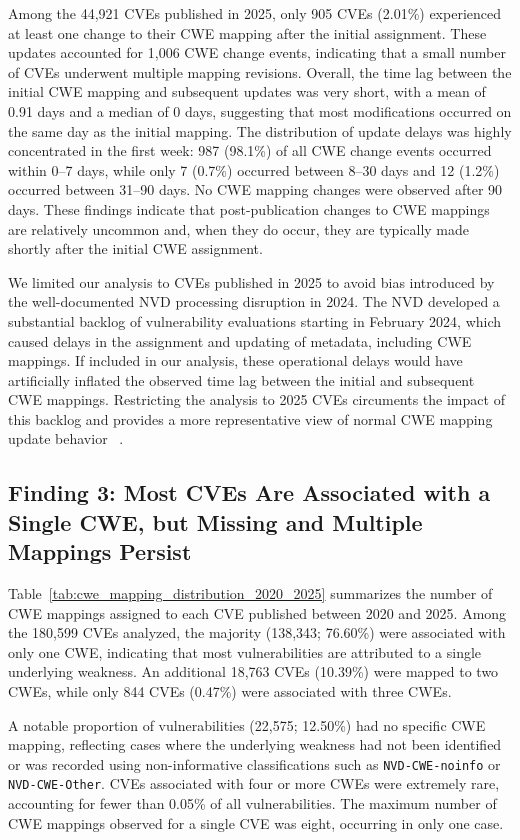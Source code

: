 \documentclass[conference,compsoc]{IEEEtran}
\begin{document}
Among the 44,921 CVEs published in 2025, only 905 CVEs (2.01\%) experienced at least one change to their CWE mapping after the initial assignment. These updates accounted for 1,006 CWE change events, indicating that a small number of CVEs underwent multiple mapping revisions. Overall, the time lag between the initial CWE mapping and subsequent updates was very short, with a mean of 0.91 days and a median of 0 days, suggesting that most modifications occurred on the same day as the initial mapping. The distribution of update delays was highly concentrated in the first week: 987 (98.1\%) of all CWE change events occurred within 0–7 days, while only 7 (0.7\%) occurred between 8–30 days and 12 (1.2\%) occurred between 31–90 days. No CWE mapping changes were observed after 90 days. These findings indicate that post-publication changes to CWE mappings are relatively uncommon and, when they do occur, they are typically made shortly after the initial CWE assignment.

We limited our analysis to CVEs published in 2025 to avoid bias introduced by the well-documented NVD processing disruption in 2024. The NVD developed a substantial backlog of vulnerability evaluations starting in February 2024, which caused delays in the assignment and updating of metadata, including CWE mappings. If included in our analysis, these operational delays would have artificially inflated the observed time lag between the initial and subsequent CWE mappings. Restricting the analysis to 2025 CVEs circuments the impact of this backlog and provides a more representative view of normal CWE mapping update behavior ~\cite{NVD2024Backlog,NIST2026NVD}.




\subsection{Finding 3: Most CVEs Are Associated with
a Single CWE, but Missing and Multiple Mappings Persist}

Table~\ref{tab:cwe_mapping_distribution_2020_2025} summarizes the number of CWE mappings assigned to each CVE published between 2020 and 2025. Among the 180,599 CVEs analyzed, the majority (138,343; 76.60\%) were associated with only one CWE, indicating that most vulnerabilities are attributed to a single underlying weakness. An additional 18,763 CVEs (10.39\%) were mapped to two CWEs, while only 844 CVEs (0.47\%) were associated with three CWEs.

A notable proportion of vulnerabilities (22,575; 12.50\%) had no specific CWE mapping, reflecting cases where the underlying weakness had not been identified or was recorded using non-informative classifications such as \texttt{NVD-CWE-noinfo} or \texttt{NVD-CWE-Other}. CVEs associated with four or more CWEs were extremely rare, accounting for fewer than 0.05\% of all vulnerabilities. The maximum number of CWE mappings observed for a single CVE was eight, occurring in only one case.
\end{document}
